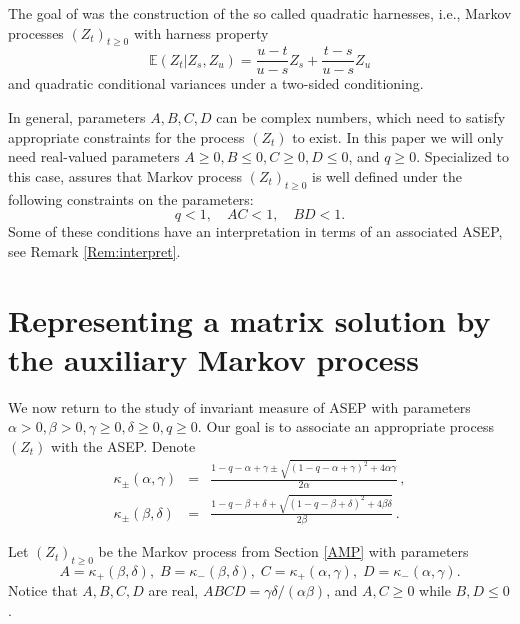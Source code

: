 \documentclass{amsart}
\theoremstyle{definition}
\theoremstyle{remark}
\theoremstyle{remark}
\theoremstyle{definition}
\numberwithin{equation}{section}
\begin{document}
 The goal of \cite{Bryc-Wesolowski-08} was the construction of the so called quadratic harnesses, i.e., Markov processes $(Z_t)_{t\geq 0}$
 with harness property
 \begin{equation}\label{QH}
  {\mathds{E}}(Z_t|Z_s,Z_u)=\frac{u-t}{u-s}Z_s+\frac{t-s}{u-s}Z_u
 \end{equation}
 and quadratic conditional variances under a two-sided conditioning.

In general, parameters $A,B,C,D$ can be complex numbers, which need to satisfy appropriate constraints for the process $(Z_t)$ to exist. In this paper we
will only need real-valued parameters $A\geq 0,B\leq 0,C\geq 0,D\leq 0$, and $q\geq 0$.
 Specialized to this case, \cite[Theorem 1.2]{Bryc-Wesolowski-08} assures that Markov process $(Z_t)_{t\geq 0}$ is well defined under
 the following constraints on the parameters:
 \begin{equation}
   \label{contraints1}
   q<1, \quad    AC<1, \quad
       BD<1.
 \end{equation}
Some of these conditions have an interpretation in terms of an associated ASEP, see Remark \ref{Rem:interpret}.

\section{Representing  a matrix solution by the auxiliary Markov process}
We now return  to the study of invariant measure of ASEP with parameters $\alpha>0,\beta>0,\gamma\geq 0,\delta\geq 0,q\geq
0$. Our goal is to associate an appropriate process $(Z_t)$ with the ASEP. Denote
 \begin{eqnarray}
\kappa_{\pm}(\alpha,\gamma)&=&\frac{1-q-\alpha+\gamma\pm\sqrt{(1-q-\alpha+\gamma)^2+4\alpha \gamma}}{2\alpha} \,, \label{kappa1}\\
\kappa_{\pm}(\beta,\delta)&=&\frac{1-q-\beta+\delta+\sqrt{(1-q-\beta+\delta)^2+4\beta\delta}}{2\beta} \,. \label{kappa2}
\end{eqnarray}

 Let $(Z_t)_{t\geq 0}$ be the Markov process from Section \ref{AMP} with parameters {}
\begin{equation}
  \label{ABCD}
  A=\kappa_{+}(\beta,\delta), \; B= \kappa_{-}(\beta,\delta), \; C=\kappa_{+}(\alpha,\gamma),\;D=\kappa_{-}(\alpha,\gamma).
\end{equation}
Notice that $A,B,C,D$ are real, $ABCD=\gamma\delta/(\alpha\beta)$, and $A,C\geq 0$ while $B,D\leq 0$.
\end{document}
